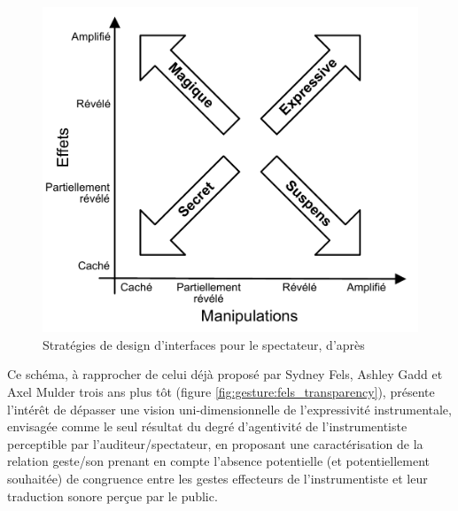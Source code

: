\begin{figure}[!htbp]
\begin{minipage}[t]{0.48\textwidth}
		\includegraphics[width=1.1\linewidth]{gfx/03_gesture/ManipulationVsEffect2.pdf}
		\caption[Stratégies de design d'interfaces pour le spectateur (schéma de Benford)]{Stratégies de design d'interfaces pour le spectateur, d'après \cite{reeves_designing_2005, benford_performing_2010}}
		\label{fig:gesture:Benford}
	\end{minipage}
\end{figure}
\noindent Ce schéma, à rapprocher de celui déjà proposé par Sydney Fels, Ashley Gadd et Axel Mulder trois ans plus tôt (figure \ref{fig:gesture:fels_transparency}), présente l'intérêt de dépasser une vision uni-dimensionnelle de l'expressivité instrumentale, envisagée comme le seul résultat du degré d'agentivité de l'instrumentiste perceptible par l'auditeur/spectateur, en proposant une caractérisation de la relation geste/son prenant en compte l'absence potentielle (et potentiellement souhaitée) de congruence entre les gestes effecteurs de l'instrumentiste et leur traduction sonore perçue par le public.\\
